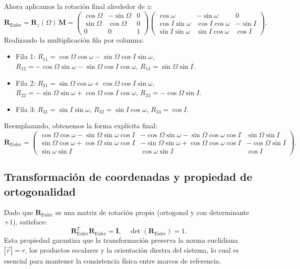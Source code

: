 Ahora aplicamos la rotación final alrededor de $z$:
\[
\mathbf{R}_{\text{Euler}} = \mathbf{R}_z(\Omega)\,\mathbf{M} =
\begin{pmatrix}
\cos\Omega & -\sin\Omega & 0 \\
\sin\Omega & \cos\Omega & 0 \\
0 & 0 & 1
\end{pmatrix}
\begin{pmatrix}
\cos\omega & -\sin\omega & 0 \\
\cos I \sin\omega & \cos I \cos\omega & -\sin I \\
\sin I \sin\omega & \sin I \cos\omega & \cos I
\end{pmatrix}.
\]
Realizando la multiplicación fila por columna:
\begin{itemize}
    \item Fila 1: $R_{11} = \cos\Omega \cos\omega - \sin\Omega \cos I \sin\omega$, \quad $R_{12} = -\cos\Omega \sin\omega - \sin\Omega \cos I \cos\omega$, \quad $R_{13} = \sin\Omega \sin I$.
    \item Fila 2: $R_{21} = \sin\Omega \cos\omega + \cos\Omega \cos I \sin\omega$, \quad $R_{22} = -\sin\Omega \sin\omega + \cos\Omega \cos I \cos\omega$, \quad $R_{23} = -\cos\Omega \sin I$.
    \item Fila 3: $R_{31} = \sin I \sin\omega$, \quad $R_{32} = \sin I \cos\omega$, \quad $R_{33} = \cos I$.
\end{itemize}
Reemplazando, obtenemos la forma explícita final:
\[
\mathbf{R}_{\text{Euler}} =
\begin{pmatrix}
\cos\Omega\cos\omega - \sin\Omega\sin\omega\cos I & -\cos\Omega\sin\omega - \sin\Omega\cos\omega\cos I & \sin\Omega\sin I \\
\sin\Omega\cos\omega + \cos\Omega\sin\omega\cos I & -\sin\Omega\sin\omega + \cos\Omega\cos\omega\cos I & -\cos\Omega\sin I \\
\sin\omega\sin I & \cos\omega\sin I & \cos I
\end{pmatrix}.
\]

\subsection{Transformación de coordenadas y propiedad de ortogonalidad}
Dado que $\mathbf{R}_{\text{Euler}}$ es una matriz de rotación propia (ortogonal y con determinante $+1$), satisface:
\[
\mathbf{R}_{\text{Euler}}^T \mathbf{R}_{\text{Euler}} = \mathbf{I}, \quad \det(\mathbf{R}_{\text{Euler}}) = 1.
\]
Esta propiedad garantiza que la transformación preserva la norma euclidiana $|\vec{r}| = r$, los productos escalares y la orientación diestra del sistema, lo cual es esencial para mantener la consistencia física entre marcos de referencia.

